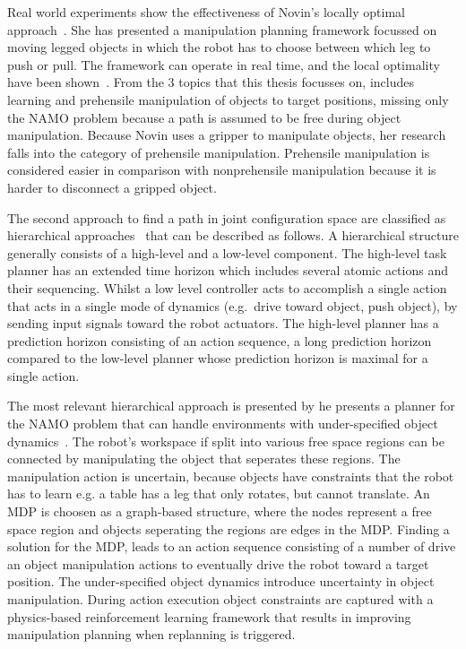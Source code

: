 Real world experiments show the effectiveness of Novin's locally optimal approach~\cite{sabbaghnovin_model_2021}. She has presented a manipulation planning framework focussed on moving legged objects in which the robot has to choose between which leg to push or pull. The framework can operate in real time, and the local optimality have been shown~\cite{sabbaghnovin_model_2021}. From the 3 topics that this thesis focusses on, \citeauthor{sabbaghnovin_model_2021} includes learning and prehensile manipulation of objects to target positions, missing only the \ac{NAMO} problem because a path is assumed to be free during object manipulation. Because Novin uses a gripper to manipulate objects, her research falls into the category of prehensile manipulation. Prehensile manipulation is considered easier in comparison with nonprehensile manipulation because it is harder to disconnect a gripped object.\bs

The second approach to find a path in joint configuration space are classified as hierarchical approaches~\cite{vega-brown_asymptotically_2020,kaelbling_hierarchical_2011,scholz_navigation_2016,wang_affordancebased_2020} that can be described as follows. A hierarchical structure generally consists of a high-level and a low-level component. The high-level task planner has an extended time horizon which includes several atomic actions and their sequencing. Whilst a low level controller acts to accomplish a single action that acts in a single mode of dynamics (e.g.~drive toward object, push object), by sending input signals toward the robot actuators. The high-level planner has a prediction horizon consisting of an action sequence, a long prediction horizon compared to the low-level planner whose prediction horizon is maximal for a single action.\bs

The most relevant hierarchical approach is presented by \citeauthor{scholz_navigation_2016} he presents a planner for the \ac{NAMO} problem that can handle environments with under-specified object dynamics~\cite{scholz_navigation_2016}. The robot's workspace if split into various free space regions can be connected by manipulating the object that seperates these regions. The manipulation action is uncertain, because objects have constraints that the robot has to learn e.g. a table has a leg that only rotates, but cannot translate. An \ac{MDP} is choosen as a graph-based structure, where the nodes represent a free space region and objects seperating the regions are edges in the \ac{MDP}. Finding a solution for the \ac{MDP}, leads to an action sequence consisting of a number of drive an object manipulation actions to eventually drive the robot toward a target position. The under-specified object dynamics introduce uncertainty in object manipulation. During action execution object constraints are captured with a physics-based reinforcement learning framework that results in improving manipulation planning when replanning is triggered.\bs

